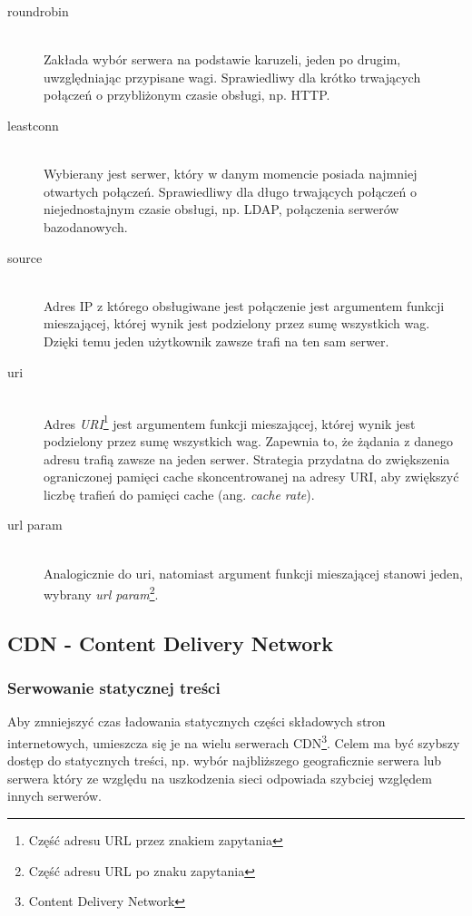 \begin{description}
  \item[roundrobin] \hfill \\
  Zakłada wybór serwera na podstawie karuzeli, jeden po drugim, uwzględniając przypisane wagi. Sprawiedliwy dla krótko trwających połączeń o przybliżonym czasie obsługi, np. HTTP.
  \item[leastconn] \hfill \\
  Wybierany jest serwer, który w danym momencie posiada najmniej otwartych połączeń. Sprawiedliwy dla długo trwających połączeń o niejednostajnym czasie obsługi, np. LDAP, połączenia serwerów bazodanowych.
  \item[source] \hfill \\
  Adres IP z którego obsługiwane jest połączenie jest argumentem funkcji mieszającej, której wynik jest podzielony przez sumę wszystkich wag. Dzięki temu jeden użytkownik zawsze trafi na ten sam serwer.
  \item[uri] \hfill \\
  Adres \emph{URI}\footnote{Część adresu URL przez znakiem zapytania} jest argumentem funkcji mieszającej, której wynik jest podzielony przez sumę wszystkich wag. Zapewnia to, że żądania z danego adresu trafią zawsze na jeden serwer. Strategia przydatna do zwiększenia ograniczonej pamięci cache skoncentrowanej na adresy URI, aby zwiększyć liczbę trafień do pamięci cache (ang. \emph{cache rate}).
  \item[url param] \hfill \\
  Analogicznie do uri, natomiast argument funkcji mieszającej stanowi jeden, wybrany \emph{url param}\footnote{Część adresu URL po znaku zapytania}.
\end{description}

\subsection{CDN - Content Delivery Network}
\label{subsub:cdn}

\subsubsection{Serwowanie statycznej treści}

Aby zmniejszyć czas ładowania statycznych części składowych stron internetowych, umieszcza się je na wielu serwerach CDN\footnote{Content Delivery Network}. Celem ma być szybszy dostęp do statycznych treści, np. wybór najbliższego geograficznie serwera lub serwera który ze względu na uszkodzenia sieci odpowiada szybciej względem innych serwerów.


